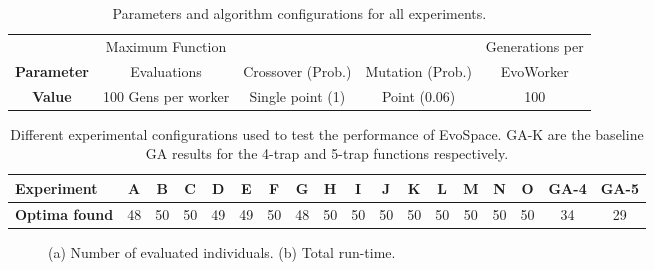 \begin{table}[t]
\caption{Parameters and algorithm configurations for all experiments.}
\centering
\begin{tabular}{|c||c|c|c|c|}
   \hline
                       & Maximum Function         &                    &                  & Generations per \\
   \textbf{Parameter}  & Evaluations              & Crossover (Prob.)  & Mutation (Prob.) & EvoWorker        \\

	\hline
   \textbf{Value}     &	100 Gens per worker &	Single point (1) &	Point  (0.06)   & 100    \\
   \hline

\end{tabular}
\label{tab:exp2}
\end{table}


\begin{table}[t]
\caption{Different experimental configurations used to test the performance of EvoSpace.
GA-K are the baseline GA results for the 4-trap and 5-trap functions respectively.}
\centering
\tiny
\begin{tabular}{|l||c|c|c|c|c|c|c|c|c|c|c|c|c|c|c|c|c|}
   \hline
             \textbf{Experiment} & A & B & C & D & E & F & G & H & I & J & K & L & M & N & O & GA-4 & GA-5 \\

   \hline
        \textbf{Optima found}   & 48 & 50 & 50 & 49 & 49 & 50 & 48 & 50 & 50 & 50 & 50 & 50 & 50 & 50 & 50 & 34 & 29 \\

   \hline
\end{tabular}
\label{tab:found}
\end{table}

\begin{figure}[t]
    \centering
    \caption{
    (a) Number of evaluated individuals.
    (b) Total run-time.}
    \label{fig:effort}
\end{figure}

